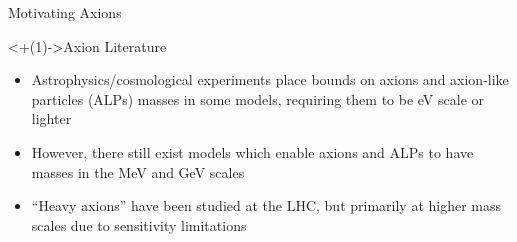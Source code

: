 \documentclass[]{beamer}
\begin{document}
\begin{frame}{Motivating Axions}
    \smallskip
    
    \begin{block}<+(1)->{Axion Literature}
        \begin{itemize}
            \item Astrophysics/cosmological experiments place bounds on axions and axion-like particles (ALPs) masses in some models, requiring them to be eV scale or lighter
            \item However, there still exist models which enable axions and ALPs to have masses in the MeV and GeV scales
            \item ``Heavy axions'' have been studied at the LHC, but primarily at higher mass scales due to sensitivity limitations  
        \end{itemize}
    \end{block}
\end{frame}
\end{document}
